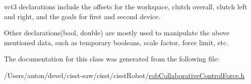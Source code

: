 vct3 declarations include the offsets for the workspace, clutch overall, clutch left and right, and the goals for first and second device.

Other declarations(bool, double) are mostly used to manipulate the above mentioned data, such as temporary booleans, scale factor, force limit, etc. 

The documentation for this class was generated from the following file\+:\begin{DoxyCompactItemize}
\item 
/\+Users/anton/devel/cisst-\/saw/cisst/cisst\+Robot/\hyperlink{rob_collaborative_control_force_8h}{rob\+Collaborative\+Control\+Force.\+h}\end{DoxyCompactItemize}
